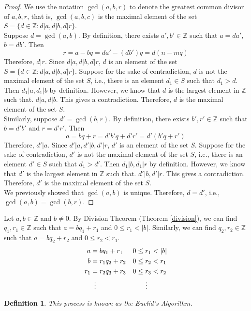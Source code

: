 \documentclass{article}
\newcommand{\Z}{\mathbb{Z}}
\newcommand{\SFTSOC}{Suppose for the sake of contradiction}
\newcommand{\st}{such that }
\newtheorem{defn}[thm]{Definition}
\begin{document}
\begin{proof}
We use the notation $\gcd(a,b,r)$ to denote the greatest common divisor of $a, b, r$, that is, $\gcd(a,b,c)$ is the maximal element of the set $S = \{d\in\Z:d|a, d|b, d|r\}$. \\

Suppose $d = \gcd(a,b)$. By definition, there exists $a', b' \in \Z$ \st $a=d a'$, $b= d b'$. Then 
$$r = a-bq = d a' - (d b')q = d(n-mq)$$
Therefore, $d|r$. Since $d|a, d|b, d|r$, $d$ is an element of the set $S = \{d\in\Z:d|a, d|b, d|r\}$. \SFTSOC, $d$ is not the maximal element of the set $S$, i.e., there is an element $d_1 \in S$ such that $d_1 > d$. Then $d_1|a, d_1|b$ by definition. However, we know that $d$ is the largest element in $\Z$ such that. $d|a, d|b$. This gives a contradiction. Therefore, $d$ is the maximal element of the set $S$. \\

Similarly, suppose $d' = \gcd(b,r)$. By definition, there exists $b', r' \in \Z$ \st $b= d' b'$ and $r = d' r'$. Then 
$$a = b q + r = d' b' q + d' r' = d' (b' q + r')$$
Therefore, $d'|a$. Since $d'|a, d'|b, d'|r$, $d'$ is an element of the set $S$. \SFTSOC, $d'$ is not the maximal element of the set $S$, i.e., there is an element $d' \in S$ such that $d_1 > d'$. Then $d_1|b, d_1|r$ by definition. However, we know that $d'$ is the largest element in $\Z$ such that. $d'|b, d'|r$. This gives a contradiction. Therefore, $d'$ is the maximal element of the set $S$. \\

We previously showed that $\gcd(a,b)$ is unique. Therefore, $d=d'$, i.e., $\gcd(a,b) = \gcd(b,r)$.
\end{proof}

Let $a,b \in \Z$ and $b \neq 0$. By Division Theorem (Theorem \ref{division}), we can find $q_1, r_1 \in \Z$ \st $a = b q_1 + r_1$ and $0 \leq r_1 < |b|$. Similarly, we can find $q_2, r_2 \in \Z$ \st $a = b q_2 + r_2$ and $0 \leq r_2 < r_1$. 
\begin{align*}
a&=b q_1+r_1           &  0 \leq r_1 &< |b| \\
b&=r_1q_2+r_2          &  0 \leq r_2 &< r_1 \\
r_1&=r_2q_3+r_3        &  0 \leq r_3 &< r_2 \\
&\vdotswithin{=} & \vdotswithin{<} 
\end{align*}
\begin{defn}
\label{eu-alg}
This process is known as the Euclid's Algorithm.
\end{defn}
\end{document}
